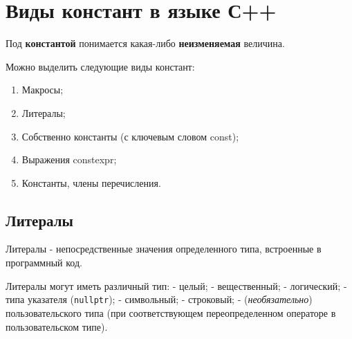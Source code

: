 \section{Виды констант в языке С++}

Под \textbf{константой} понимается какая-либо \textbf{неизменяемая}
величина.

Можно выделить следующие виды констант:
\begin{enumerate}
  \item Макросы;
  \item Литералы;
  \item Собственно константы (с ключевым словом const);
  \item Выражения constexpr;
  \item Константы, члены перечисления.
\end{enumerate}

\subsection{Литералы}

Литералы - непосредственные значения определенного типа, встроенные в
программный код.

Литералы могут иметь различный тип: - целый; - вещественный; -
логический; - типа указателя (\texttt{nullptr}); - символьный; -
строковый; - (\emph{необязательно}) пользовательского типа (при
соответствующем переопределенном операторе в пользовательском типе).

